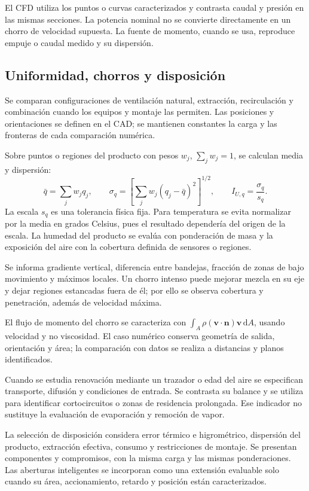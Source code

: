 El CFD utiliza los puntos o curvas caracterizados y contrasta caudal y presión en las mismas secciones. La potencia nominal no se convierte directamente en un chorro de velocidad supuesta. La fuente de momento, cuando se usa, reproduce empuje o caudal medido y su dispersión.

\subsection{Uniformidad, chorros y disposición}
\label{met:uniformidad}

Se comparan configuraciones de ventilación natural, extracción, recirculación y combinación cuando los equipos y montaje las permiten. Las posiciones y orientaciones se definen en el CAD; se mantienen constantes la carga y las fronteras de cada comparación numérica.

Sobre puntos o regiones del producto con pesos $w_j$, $\sum_jw_j=1$, se calculan media y dispersión:
\begin{equation}
\bar q=\sum_jw_jq_j,\qquad
\sigma_q=\left[
\sum_jw_j(q_j-\bar q)^2
\right]^{1/2},
\qquad
I_{U,q}=\frac{\sigma_q}{s_q}.
\label{met:dispersion_espacial}
\end{equation}
La escala $s_q$ es una tolerancia física fija. Para temperatura se evita normalizar por la media en grados Celsius, pues el resultado dependería del origen de la escala. La humedad del producto se evalúa con ponderación de masa y la exposición del aire con la cobertura definida de sensores o regiones.

Se informa gradiente vertical, diferencia entre bandejas, fracción de zonas de bajo movimiento y máximos locales. Un chorro intenso puede mejorar mezcla en su eje y dejar regiones estancadas fuera de él; por ello se observa cobertura y penetración, además de velocidad máxima.

El flujo de momento del chorro se caracteriza con $\int_A\rho(\mathbf v\cdot\mathbf n)\mathbf v\,\mathrm dA$, usando velocidad y no viscosidad. El caso numérico conserva geometría de salida, orientación y área; la comparación con datos se realiza a distancias y planos identificados.

Cuando se estudia renovación mediante un trazador o edad del aire se especifican transporte, difusión y condiciones de entrada. Se contrasta su balance y se utiliza para identificar cortocircuitos o zonas de residencia prolongada. Ese indicador no sustituye la evaluación de evaporación y remoción de vapor.

La selección de disposición considera error térmico e higrométrico, dispersión del producto, extracción efectiva, consumo y restricciones de montaje. Se presentan componentes y compromisos, con la misma carga y las mismas ponderaciones. Las aberturas inteligentes se incorporan como una extensión evaluable solo cuando su área, accionamiento, retardo y posición están caracterizados.

